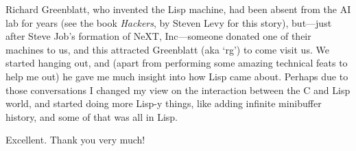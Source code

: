 \documentclass[format=acmsmall,screen]{acmart}
\begin{document}
Richard Greenblatt, who invented the Lisp machine, had been absent from
the AI lab for years (see the book \textit{Hackers}, by Steven Levy for this story),
but---just after Steve Job's formation of NeXT, Inc---someone donated one
of their machines to us, and this attracted Greenblatt (aka `rg') to come
visit us. We started hanging out, and (apart from performing some amazing
technical feats to help me out) he gave me much insight into how
Lisp came about.  Perhaps due to those conversations I changed my view on
the interaction between the C and Lisp world, and started doing more Lisp-y
things, like adding infinite minibuffer history, and some of that was all
in Lisp.

\begin{question}
  Excellent.  Thank you very much!
\end{question}




\end{document}
